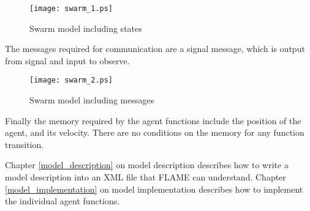 \begin{figure}[h]
\begin{center}
\texttt{[image: swarm\_1.ps]}
\caption{Swarm model including states}
\label{fig:swarm_1}
\end{center}
\end{figure}

The messages required for communication are a signal message, which is output
from signal and input to observe.

\begin{figure}[h]
\begin{center}
\texttt{[image: swarm\_2.ps]}
\caption{Swarm model including messages}
\label{fig:swarm_1}
\end{center}
\end{figure}

Finally the memory required by the agent functions include the position of the
agent, and its velocity. There are no conditions on the memory for any function
transition.

Chapter \ref{model_description} on model description describes how to write a
model description into an XML file that FLAME can understand. Chapter
\ref{model_implementation} on model implementation describes how to implement
the individual agent functions. 

